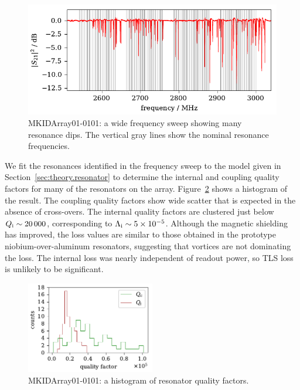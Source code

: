 \begin{figure}[htb]
\centering
\includegraphics[width=\textwidth]{multichroic/mkidarray01_full_s21_sweep.pdf}
\caption[MKIDArray01-0101: a wide frequency sweep showing many resonance dips.]
{
MKIDArray01-0101: a wide frequency sweep showing many resonance dips.
The vertical gray lines show the nominal resonance frequencies.
}
\label{fig:mkidarray01_full_s21_sweep}
\end{figure}

We fit the resonances identified in the frequency sweep to the model given in Section~\ref{sec:theory.resonator} to determine the internal and coupling quality factors for many of the resonators on the array.
Figure~\ref{fig:mkidarray01_histogram_Qi_Qc} shows a histogram of the result.
The coupling quality factors show wide scatter that is expected in the absence of cross-overs.
The internal quality factors are clustered just below
$Q_{\mathrm{i}} \sim \num{20000}$,
corresponding to
$\Lambda_{\mathrm{i}} \sim \num{5e-5}$.
Although the magnetic shielding has improved, the loss values are similar to those obtained in the prototype niobium-over-aluminum resonators, suggesting that vortices are not dominating the loss.
The internal loss was nearly independent of readout power, so TLS loss is unlikely to be significant. 

\begin{figure}[htb]
\centering
\includegraphics[width=0.5\textwidth]{multichroic/mkidarray01_histogram_Qi_Qc.pdf}
\caption[MKIDArray01-0101: a histogram of resonator quality factors.]
{
MKIDArray01-0101: a histogram of resonator quality factors.
}
\label{fig:mkidarray01_histogram_Qi_Qc}
\end{figure}

